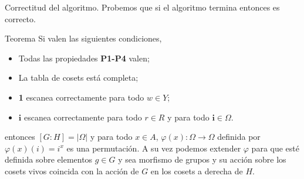 \documentclass[aspectratio=169, 9pt]{beamer}
\begin{document}
\begin{frame}[fragile]{Correctitud del algoritmo.}
Probemos que si el algoritmo termina entonces es correcto.
\pause
\begin{alertblock}{Teorema}
	Si valen las siguientes condiciones,
	\begin{itemize}
		\item Todas las propiedades \textbf{P1-P4} valen;
		\item La tabla de cosets está completa;
		\item \textbf{1} escanea correctamente para todo $w \in Y$;
		\item $\textbf{i}$ escanea correctamente para todo $r \in R$ y para todo $\textbf{i} \in \Omega$.
	\end{itemize}
	\pause
	entonces $[G:H] = |\Omega|$ y para todo $x \in A$, $\varphi(x): \Omega \to \Omega$ definida por $\varphi(x)(i) = i^x$ es una permutación.
	A su vez podemos extender $\varphi$ para que esté definida sobre elementos $g \in G$ y sea morfismo de grupos y su acción sobre los cosets vivos coincida con la acción de $G$ en los cosets a derecha de $H$.
\end{alertblock}
\pause
\medskip
\end{frame}
\end{document}
